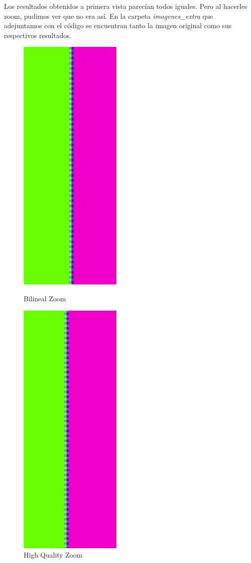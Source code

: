 Los resultados obtenidos a primera vista parecían todos iguales. Pero al hacerles zoom, pudimos ver que no era así. En la carpeta \textit{imagenes\_extra} que adejuntamos con el código se encuentran tanto la imagen original como sus respectivos resultados.
\begin{figure}[!htb]
\begin{center}
    \includegraphics[scale=0.6]{imagenes/colores_bilineal_zoom.jpg}
    \caption{Bilineal Zoom}
        \end{center}
\endminipage
{}
\begin{center}
    \includegraphics[scale=0.6]{imagenes/colores_hq_zoom.jpg}
    \caption{High Quality Zoom}
        \end{center}
\endminipage 
\end{figure}
